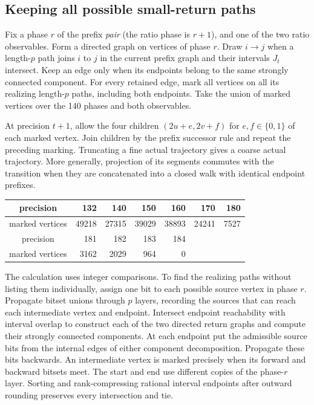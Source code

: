\documentclass[11pt,letterpaper]{article}
\begin{document}
\subsection*{Keeping all possible small-return paths}
Fix a phase $r$ of the prefix \emph{pair} (the ratio phase is $r+1$), and one of the two ratio observables. Form a directed graph on vertices of phase $r$. Draw $i\longrightarrow j$ when a length-$p$ path joins $i$ to $j$ in the current prefix graph and their intervals $J_t$ intersect. Keep an edge only when its endpoints belong to the same strongly connected component. For every retained edge, mark all vertices on all its realizing length-$p$ paths, including both endpoints. Take the union of marked vertices over the 140 phases and both observables.

\newpage
At precision $t+1$, allow the four children $(2u+e,2v+f)$ for $e,f\in\{0,1\}$ of each marked vertex. Join children by the prefix successor rule and repeat the preceding marking. Truncating a fine actual trajectory gives a coarse actual trajectory. More generally, projection of its segments commutes with the transition when they are concatenated into a closed walk with identical endpoint prefixes.

\begin{center}
\begin{tabular}{c|rrrrrr}
precision &132&140&150&160&170&180\\\midrule
marked vertices&49218&27315&39029&38893&24241&7527\\\addlinespace
precision&181&182&183&184&&\\\midrule
marked vertices&3162&2029&964&0&&
\end{tabular}
\end{center}
The calculation uses integer comparisons. To find the realizing paths without listing them individually, assign one bit to each possible source vertex in phase $r$. Propagate bitset unions through $p$ layers, recording the sources that can reach each intermediate vertex and endpoint. Intersect endpoint reachability with interval overlap to construct each of the two directed return graphs and compute their strongly connected components. At each endpoint put the admissible source bits from the internal edges of either component decomposition. Propagate these bits backwards. An intermediate vertex is marked precisely when its forward and backward bitsets meet. The start and end use different copies of the phase-$r$ layer. Sorting and rank-compressing rational interval endpoints after outward rounding preserves every intersection and tie.
\end{document}
